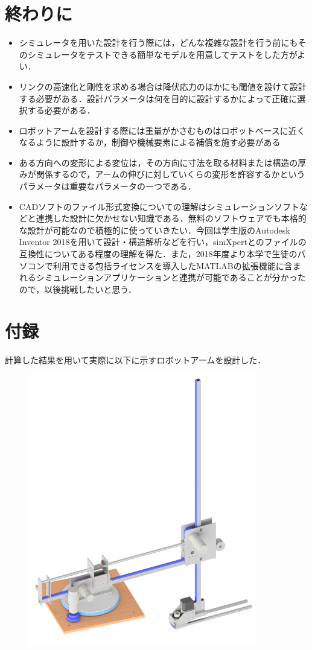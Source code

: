 \documentclass[10pt,b5paper,papersize,dvipdfmx]{jsbook}
\begin{document}
\section{終わりに}
\begin{itemize}
\item シミュレータを用いた設計を行う際には，どんな複雑な設計を行う前にもそのシミュレータをテストできる簡単なモデルを用意してテストをした方がよい．
\item リンクの高速化と剛性を求める場合は降伏応力のほかにも閾値を設けて設計する必要がある．設計パラメータは何を目的に設計するかによって正確に選択する必要がある．
\item ロボットアームを設計する際には重量がかさむものはロボットベースに近くなるように設計するか，制御や機械要素による補償を施す必要がある
\item ある方向への変形による変位は，その方向に寸法を取る材料または構造の厚みが関係するので，アームの伸びに対していくらの変形を許容するかというパラメータは重要なパラメータの一つである．
\item CADソフトのファイル形式変換についての理解はシミュレーションソフトなどと連携した設計に欠かせない知識である．無料のソフトウェアでも本格的な設計が可能なので積極的に使っていきたい．今回は学生版のAutodesk Inventor 2018を用いて設計・構造解析などを行い，simXpertとのファイルの互換性についてある程度の理解を得た．また，2018年度より本学で生徒のパソコンで利用できる包括ライセンスを導入したMATLABの拡張機能に含まれるシミュレーションアプリケーションと連携が可能であることが分かったので，以後挑戦したいと思う．
\end{itemize}

\section{付録}
計算した結果を用いて実際に以下に示すロボットアームを設計した．
\begin{figure}[H]
  \centering
  \includegraphics[width=10cm]{img/robot33.png}
\end{figure}
\end{document}
